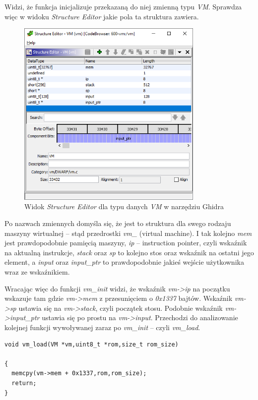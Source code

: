 \documentclass[language=polish,type=eng]{aghmodern}
\begin{document}
Widzi, że funkcja inicjalizuje przekazaną do niej zmienną typu \emph{VM}.
Sprawdza więc w widoku \emph{Structure Editor} jakie pola ta struktura zawiera.

\begin{figure}[H]
\centering
\includegraphics[width=9cm]{600_struct}
\caption{Widok \emph{Structure Editor} dla typu danych \emph{VM} w narzędziu Ghidra}
\end{figure}

Po nazwach zmiennych domyśla się, że jest to struktura dla swego rodzaju maszyny wirtualnej
-- stąd przedrostki \emph{vm\_} (virtual machine). I tak kolejno \emph{mem} jest prawdopodobnie
pamięcią maszyny, \emph{ip} -- instruction pointer, czyli wskaźnik na aktualną instrukcje,
\emph{stack} oraz \emph{sp} to kolejno stos oraz wskaźnik na ostatni jego element, a \emph{input}
oraz \emph{input\_ptr} to prawdopodobnie jakieś wejście użytkownika wraz ze wskaźnikiem.

Wracając więc do funkcji \emph{vm\_init} widzi, że wskaźnik \emph{vm->ip} na początku wskazuje
tam gdzie \emph{vm->mem} z przesunięciem o \emph{0x1337} bajtów. Wskaźnik \emph{vm->sp} ustawia
się na \emph{vm->stack}, czyli początek stosu. Podobnie wskaźnik \emph{vm->input\_ptr} ustawia
się po prostu na \emph{vm->input}.
Przechodzi do analizowanie kolejnej funkcji wywoływanej zaraz po \emph{vm\_init} -- czyli
\emph{vm\_load}.

\begin{verbatim}
void vm_load(VM *vm,uint8_t *rom,size_t rom_size)

{
  memcpy(vm->mem + 0x1337,rom,rom_size);
  return;
}
\end{verbatim}
\end{document}
